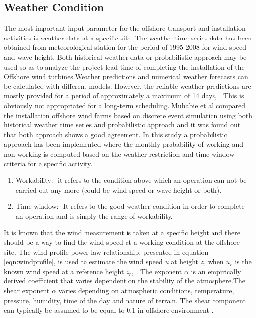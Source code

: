 \subsection{Weather Condition}

The most important input parameter for the offshore transport and installation activities is weather data at a specific site. The weather time series data has been obtained from meteorological station for the period of 1995-2008 for wind speed and wave height. Both historical weather data or probabilistic approach may be used so as to  analyze the project lead time of completing the installation of the Offshore wind turbines.Weather predictions and numerical weather forecasts can be calculated with different models. However, the reliable weather predictions are mostly provided for a period of approximately a maximum of 14 days, \cite{hinnenthal2007}. This is obviously not appropriated for a long-term scheduling. Muhabie et al \cite{Muhabie2015} compared the installation offshore wind farms based on discrete event simulation using both historical weather time series and probabilistic approach  and it was found out that both approach shows a good agreement. In this study a probabilistic approach has been implemented where the monthly probability of working and non working is computed based on the weather restriction and time window criteria for a specific activity. 
\begin{enumerate}
\item
Workability:- it refers to the condition above which an operation can not be carried out any more (could be wind speed or wave height or both).
\item Time window:- It refers to the good weather condition in order to complete an operation and is simply the range of workability.
\end{enumerate}
It is known that the wind measurement is taken at a specific height and there should be a way to find the wind speed at a working condition at the offshore site. 
The wind profile power law relationship, presented in equation \ref{eqn:windprofile}, is used to estimate the wind speed $u$ at height $z$, when $u_{r}$ is the known wind speed at a reference height $z_{r}$, \cite{1978Peterson}. The exponent $\alpha$ is an empirically derived coefficient that varies dependent on the stability of the atmosphere.The shear exponent $\alpha$ varies depending on atmospheric conditions, temperature, pressure, humidity, time of the day and nature of terrain\cite{Manwell2009}. The shear component can typically be assumed to be equal to 0.1 in offshore environment \cite{Bechrakis2000, Burton2011}.

